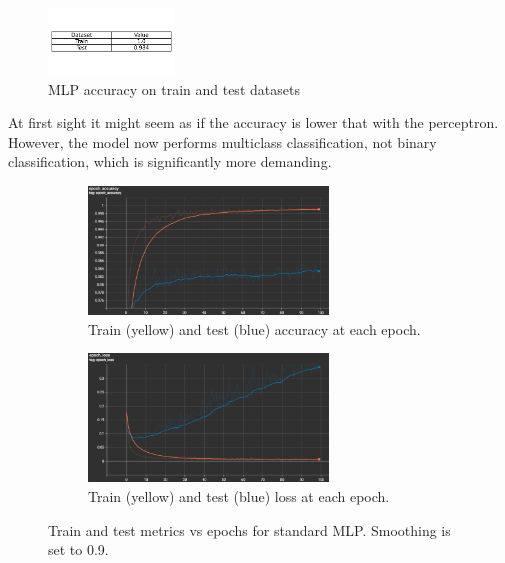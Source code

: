 \documentclass{article}
\begin{document}
\begin{figure}[h!]
    \centering
    \includegraphics[width=0.3\textwidth]{./plots/plot10.png}
    \caption{MLP accuracy on train and test datasets}
    \label{fig:plot6}
\end{figure}

At first sight it might seem as if the accuracy is lower that with the perceptron.
However, the model now performs multiclass classification, not binary classification, which is significantly more demanding.

\begin{figure}[h!]
    \centering
    \begin{subfigure}[t]{\textwidth}
        \centering
        \includegraphics[width=0.7\textwidth]{./plots/screenshot1.png}
        \caption{Train (yellow) and test (blue) accuracy at each epoch.}
        \label{fig:fig7a}
    \end{subfigure}
    \vspace{0.2cm}
    \begin{subfigure}[t]{\textwidth}
        \centering
        \includegraphics[width=0.7\textwidth]{./plots/screenshot2.png}
        \caption{Train (yellow) and test (blue) loss at each epoch.}
        \label{fig:fig7b}
    \end{subfigure}
    \caption{Train and test metrics vs epochs for standard MLP. Smoothing is set to 0.9.}
    \label{fig:plot7}
\end{figure}
\end{document}
